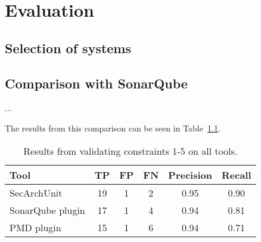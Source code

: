 \chapter{Evaluation}

\section{Selection of systems}

\section{Comparison with SonarQube}
...

The results from this comparison can be seen in Table~\ref{tab:results_comparison}.

\begin{table}
\begin{center}
\begin{tabular}{lccccc}
\hline
\textbf{Tool} & \textbf{TP} & \textbf{FP} & \textbf{FN} & \textbf{Precision} & \textbf{Recall}\\
\hline
SecArchUnit & 19 & 1 & 2 & 0.95 & 0.90\\
\rowcolor{RowColor}
SonarQube plugin & 17 & 1 & 4 & 0.94 & 0.81\\
PMD plugin & 15 & 1 & 6 & 0.94 & 0.71\\
\hline
\end{tabular}
\end{center}
\caption{Results from validating constraints 1-5 on all tools.}
\label{tab:results_comparison}
\end{table}

